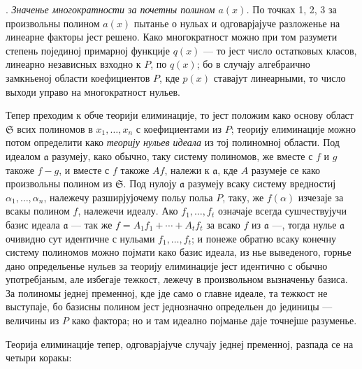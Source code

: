 ﻿\documentclass[11pt]{article}
\providecommand{\fraka}{\mathfrak a}
\providecommand{\frakS}{\mathfrak S}
\begin{document}
. \emph{Значенье многократности за почетны полином $a(x)$.} По точках 1, 2, 3 за произвольны полином $a(x)$ пытанье о нульах и одговарјајуче разложенье на линеарне факторы јест решено. Како многократност можно при том разумети степень појединој примарној функције $q(x)$ --- то јест число остатковых класов, линеарно независных взходно к $P$, по $q(x)$; бо в случају алгебраично замкньеној области коефициентов $P$, кде $p(x)$ ставајут линеарными, то число выходи управо на многократност нульев.

Тепер преходим к обче теорији елиминације, то јест положим како основу област $\frakS$ всих полиномов в $x_1,\ldots,x_n$ с коефициентами из $P$; теорију елиминације можно потом определити како \emph{теорију нульев идеала} из тој полиномној области. Под идеалом $\fraka$ разумеју, како обычно, таку систему полиномов, же вместе с $f$ и $g$ такоже $f-g$, и вместе с $f$ такоже $Af$, належи к $\fraka$, кде $A$ разумеје се како произвольны полином из $\frakS$. Под нулоју $\fraka$ разумеју всаку систему вредностиј $\alpha_1,\ldots,\alpha_n$, належечу разширјујочему польу польа $P$, таку, же $f(\alpha)$ изчезаје за всакы полином $f$, належечи идеалу. Ако $f_1,\ldots,f_t$ означаје всегда сушчествујучи базис идеала $\fraka$ --- так же $f=A_1f_1+\cdots+A_tf_t$ за всако $f$ из $\fraka$ ---, тогда нулье $\fraka$ очивидно сут идентичне с нульами $f_1,\ldots,f_t$; и понеже обратно всаку конечну систему полиномов можно појмати како базис идеала, из нье выведеного, горнье дано определьенье нульев за теорију елиминације јест идентично с обычно употребјаным, але избегаје тежкост, лежечу в произвольном вызначеньу базиса. За полиномы једнеј пременној, кде јде само о главне идеале, та тежкост не выступаје, бо базисны полином јест једнозначно определьен до јединицы --- величины из $P$ како фактора; но и там идеално појманье даје точнејше разуменье.

Теорија елиминације тепер, одговарјајуче случају једнеј пременној, разпада се на четыри коракы:
\end{document}
